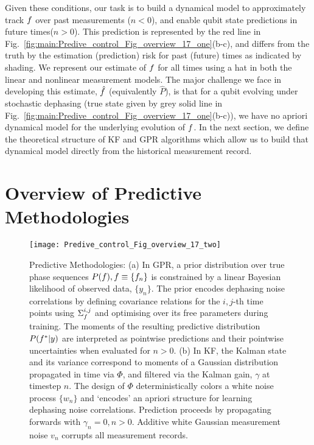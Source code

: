 \documentclass[pra, reprint]{revtex4-1}
\begin{document}
Given these conditions, our task is to build a dynamical model to approximately track $f$ over past measurements ($n<0$), and enable qubit state predictions in future times($n>0$).  This prediction is represented by the red line in Fig.~\ref{fig:main:Predive_control_Fig_overview_17_one}(b-c), and differs from the truth by the estimation (prediction) risk for past (future) times as indicated by shading.  We represent our estimate of $f$ for all times using a hat in both the linear and nonlinear measurement models.  The major challenge we face in developing this estimate, $\hat{f}$ (equivalently $\hat{P}$), is that for a qubit evolving under stochastic dephasing (true state given by grey solid line in Fig.~\ref{fig:main:Predive_control_Fig_overview_17_one}(b-c)), we have no apriori dynamical model for the underlying evolution of $f$.  In the next section, we define the theoretical structure of KF and GPR algorithms which allow us to build that dynamical model directly from the historical measurement record. 




\section{Overview of Predictive Methodologies \label{sec:main:OverviewofPredictive Methodologies}}
\begin{figure*}[ht]
    \texttt{[image: Predive\_control\_Fig\_overview\_17\_two]} 
    \caption{ \label{fig:main:Predive_control_Fig_overview_17_two} Predictive Methodologies: (a) In GPR, a prior  distribution over true phase sequences $P(f), f \equiv \{ f_n \}$ is constrained by a linear Bayesian likelihood of observed data, $\{ y_n\}$. The prior encodes dephasing noise correlations by defining covariance relations for the $i, j$-th time points using  $\Sigma_f^{i, j}$ and optimising over its free parameters during training. The moments of the resulting predictive distribution $P(f^*|y)$ are interpreted as pointwise predictions and their pointwise uncertainties when evaluated for $n>0$.  (b) In KF, the Kalman state and its variance correspond to moments of a Gaussian distribution propagated in time via $\Phi$, and filtered via the Kalman gain, $\gamma$ at timestep $n$. The design of $\Phi$ deterministically colors a white noise process $\{w_n \}$ and `encodes' an apriori structure for learning dephasing noise correlations. Prediction proceeds by propagating forwards with $\gamma_n=0, n>0$. Additive white Gaussian measurement noise $v_n$ corrupts all measurement records.}
\end{figure*}
\end{document}

